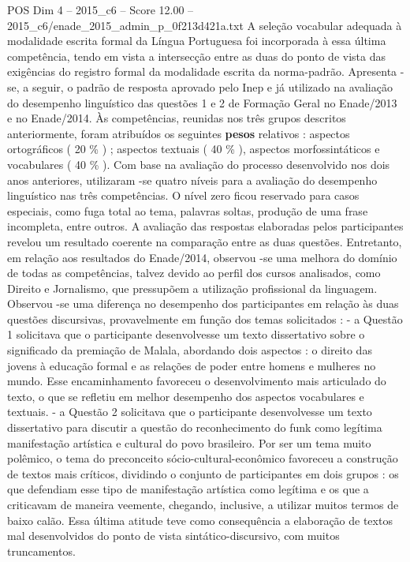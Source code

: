 \begin{textsample}{POS Dim 4 – 2015\_c6 – Score 12.00 – 2015\_c6/enade\_2015\_admin\_p\_0f213d421a.txt}
A seleção vocabular adequada à modalidade escrita formal da Língua Portuguesa foi incorporada à essa última competência, tendo em vista a intersecção entre as duas do ponto de vista das exigências do registro formal da modalidade escrita da norma-padrão.
Apresenta -se, a seguir, o padrão de resposta aprovado pelo Inep e já utilizado na avaliação do desempenho linguístico das questões 1 e 2 de Formação Geral no Enade/2013 e no Enade/2014.
Às competências, reunidas nos três grupos descritos anteriormente, foram atribuídos os seguintes \textbf{pesos} relativos : aspectos ortográficos ( 20 \% ) ; aspectos textuais ( 40 \% ), aspectos morfossintáticos e vocabulares ( 40 \% ).
Com base na avaliação do processo desenvolvido nos dois anos anteriores, utilizaram -se quatro níveis para a avaliação do desempenho linguístico nas três competências.
O nível zero ficou reservado para casos especiais, como fuga total ao tema, palavras soltas, produção de uma frase incompleta, entre outros.
A avaliação das respostas elaboradas pelos participantes revelou um resultado coerente na comparação entre as duas questões.
Entretanto, em relação aos resultados do Enade/2014, observou -se uma melhora do domínio de todas as competências, talvez devido ao perfil dos cursos analisados, como Direito e Jornalismo, que pressupõem a utilização profissional da linguagem.
Observou -se uma diferença no desempenho dos participantes em relação às duas questões discursivas, provavelmente em função dos temas solicitados : - a Questão 1 solicitava que o participante desenvolvesse um texto dissertativo sobre o significado da premiação de Malala, abordando dois aspectos : o direito das jovens à educação formal e as relações de poder entre homens e mulheres no mundo.
Esse encaminhamento favoreceu o desenvolvimento mais articulado do texto, o que se refletiu em melhor desempenho dos aspectos vocabulares e textuais. - a Questão 2 solicitava que o participante desenvolvesse um texto dissertativo para discutir a questão do reconhecimento do funk como legítima manifestação artística e cultural do povo brasileiro.
Por ser um tema muito polêmico, o tema do preconceito sócio-cultural-econômico favoreceu a construção de textos mais críticos, dividindo o conjunto de participantes em dois grupos : os que defendiam esse tipo de manifestação artística como legítima e os que a criticavam de maneira veemente, chegando, inclusive, a utilizar muitos termos de baixo calão.
Essa última atitude teve como consequência a elaboração de textos mal desenvolvidos do ponto de vista sintático-discursivo, com muitos truncamentos.

\end{textsample}

